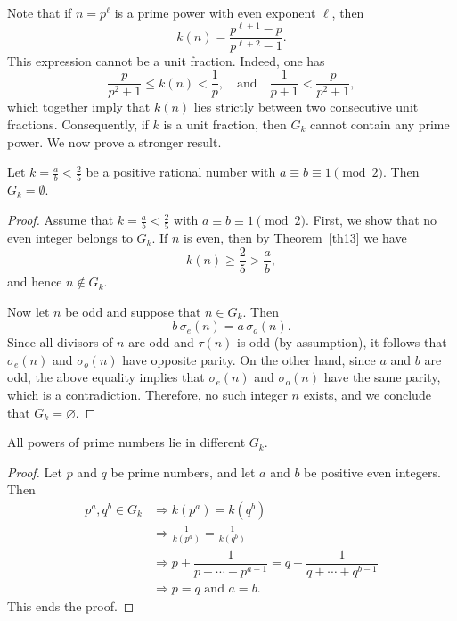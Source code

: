 \documentclass[12pt,reqno]{article}
\begin{document}
Note that if \( n = p^{\ell} \) is a prime power with even exponent \( \ell \), then
\[
k(n) = \frac{p^{\ell+1} - p}{p^{\ell+2} - 1}.
\]
This expression cannot be a unit fraction. Indeed, one has
\[
\frac{p}{p^2+1} \leq k(n) < \frac{1}{p},
\quad \text{and} \quad
\frac{1}{p+1} < \frac{p}{p^2+1},
\]
which together imply that \( k(n) \) lies strictly between two consecutive unit fractions. Consequently, if \( k \) is a unit fraction, then \( G_k \) cannot contain any prime power. We now prove a stronger result.

\begin{theorem}
Let \( k = \frac{a}{b} < \frac{2}{5} \) be a positive rational number with \( a \equiv b \equiv 1 \pmod{2} \). Then \( G_k = \emptyset \).
\end{theorem}

\begin{proof}
Assume that \( k = \frac{a}{b} < \frac{2}{5} \) with \( a \equiv b \equiv 1 \pmod{2} \).
First, we show that no even integer belongs to \( G_k \). If \( n \) is even, then by Theorem~\ref{th13} we have
\[
k(n) \geq \frac{2}{5} > \frac{a}{b},
\]
and hence \( n \notin G_k \).

Now let \( n \) be odd and suppose that \( n \in G_k \). Then
\[
b \, \sigma_e(n) = a \, \sigma_o(n).
\]
Since all divisors of \( n \) are odd and \( \tau(n) \) is odd (by assumption), it follows that \( \sigma_e(n) \) and \( \sigma_o(n) \) have opposite parity.
On the other hand, since \( a \) and \( b \) are odd, the above equality implies that \( \sigma_e(n) \) and \( \sigma_o(n) \) have the same parity, which is a contradiction.
Therefore, no such integer \( n \) exists, and we conclude that \( G_k = \varnothing \).
\end{proof}

\begin{theorem}
All powers of prime numbers lie in different \( G_k \).
\end{theorem}

\begin{proof}
Let \( p \) and \( q \) be prime numbers, and let \( a \) and \( b \) be positive even integers. Then
\begin{align*}
p^a, q^b \in G_k &\Rightarrow k(p^a) = k(q^b) \\
&\Rightarrow \frac{1}{k(p^a)} = \frac{1}{k(q^b)} \\
&\Rightarrow p + \dfrac{1}{p + \cdots + p^{a-1}} = q + \dfrac{1}{q + \cdots + q^{b-1}} \\
&\Rightarrow p = q \text{ and } a = b.
\end{align*}
This ends the proof.
\end{proof}
\end{document}
